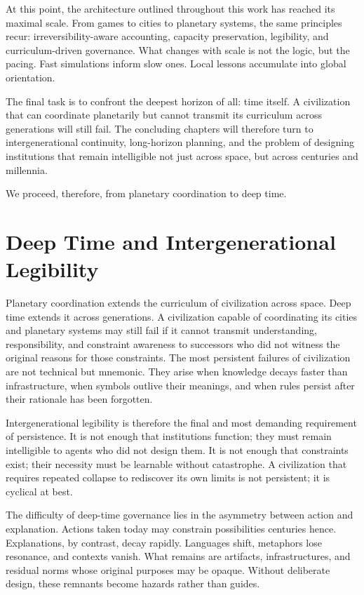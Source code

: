 \documentclass[12pt,oneside]{book}
\begin{document}
At this point, the architecture outlined throughout this work has reached its maximal scale. From games to cities to planetary systems, the same principles recur: irreversibility-aware accounting, capacity preservation, legibility, and curriculum-driven governance. What changes with scale is not the logic, but the pacing. Fast simulations inform slow ones. Local lessons accumulate into global orientation.

The final task is to confront the deepest horizon of all: time itself. A civilization that can coordinate planetarily but cannot transmit its curriculum across generations will still fail. The concluding chapters will therefore turn to intergenerational continuity, long-horizon planning, and the problem of designing institutions that remain intelligible not just across space, but across centuries and millennia.

We proceed, therefore, from planetary coordination to deep time.

\chapter{Deep Time and Intergenerational Legibility}

Planetary coordination extends the curriculum of civilization across space. Deep time extends it across generations. A civilization capable of coordinating its cities and planetary systems may still fail if it cannot transmit understanding, responsibility, and constraint awareness to successors who did not witness the original reasons for those constraints. The most persistent failures of civilization are not technical but mnemonic. They arise when knowledge decays faster than infrastructure, when symbols outlive their meanings, and when rules persist after their rationale has been forgotten.

Intergenerational legibility is therefore the final and most demanding requirement of persistence. It is not enough that institutions function; they must remain intelligible to agents who did not design them. It is not enough that constraints exist; their necessity must be learnable without catastrophe. A civilization that requires repeated collapse to rediscover its own limits is not persistent; it is cyclical at best.

The difficulty of deep-time governance lies in the asymmetry between action and explanation. Actions taken today may constrain possibilities centuries hence. Explanations, by contrast, decay rapidly. Languages shift, metaphors lose resonance, and contexts vanish. What remains are artifacts, infrastructures, and residual norms whose original purposes may be opaque. Without deliberate design, these remnants become hazards rather than guides.
\end{document}
